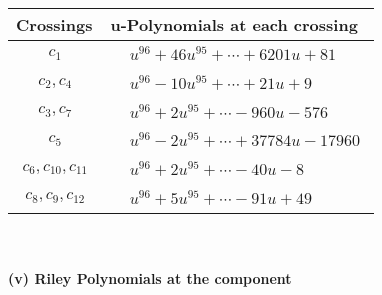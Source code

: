 \documentclass[1p]{elsarticle_modified}
\theoremstyle{definition}
\begin{document}
\begin{tabular}{m{50pt}|m{274pt}}
Crossings & \hspace{64pt}u-Polynomials at each crossing \\
\hline $$\begin{aligned}c_{1}\end{aligned}$$&$\begin{aligned}
&u^{96}+46 u^{95}+\cdots+6201 u+81
\end{aligned}$\\
\hline $$\begin{aligned}c_{2},c_{4}\end{aligned}$$&$\begin{aligned}
&u^{96}-10 u^{95}+\cdots+21 u+9
\end{aligned}$\\
\hline $$\begin{aligned}c_{3},c_{7}\end{aligned}$$&$\begin{aligned}
&u^{96}+2 u^{95}+\cdots-960 u-576
\end{aligned}$\\
\hline $$\begin{aligned}c_{5}\end{aligned}$$&$\begin{aligned}
&u^{96}-2 u^{95}+\cdots+37784 u-17960
\end{aligned}$\\
\hline $$\begin{aligned}c_{6},c_{10},c_{11}\end{aligned}$$&$\begin{aligned}
&u^{96}+2 u^{95}+\cdots-40 u-8
\end{aligned}$\\
\hline $$\begin{aligned}c_{8},c_{9},c_{12}\end{aligned}$$&$\begin{aligned}
&u^{96}+5 u^{95}+\cdots-91 u+49
\end{aligned}$\\
\hline
\end{tabular}\\~\\
\newpage\renewcommand{\arraystretch}{1}
\flushleft \textbf{(v) Riley Polynomials at the component}\newline \\
\end{document}
